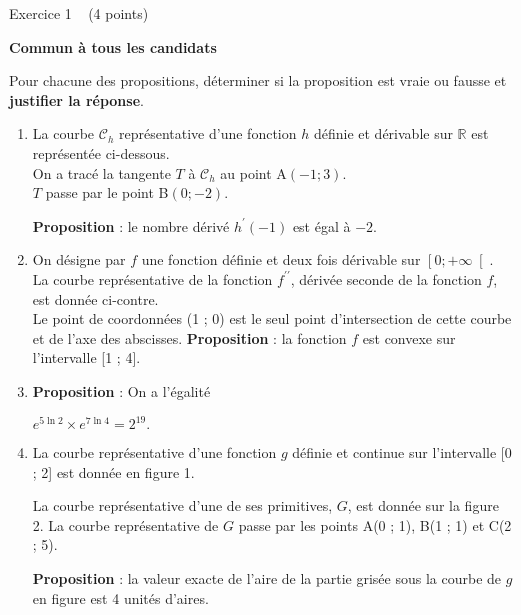 
%
\begin{h2}Exercice 1   (4 points)\end{h2}
\textbf{Commun à tous les candidats}
\par
Pour chacune des propositions, déterminer si la proposition est vraie ou fausse et \textbf{justifier la réponse}.
\begin{enumerate}
     \item
     La courbe $\mathscr C_{h}$ représentative d'une fonction $h$ définie et dérivable sur $\mathbb{R}$ est représentée  ci-dessous.
\\
     On a tracé la tangente $T$ à $\mathscr C_{h}$ au point A$\left(- 1 ; 3\right)$.
\\     
     $T$ passe par le point B$\left(0 ;-2\right)$.

\begin{center}
\end{center}
     \textbf{Proposition}  : le nombre dérivé $h^{\prime}\left(-1\right)$ est égal à $-2$.
     \item
     On désigne par $f$ une fonction définie et deux fois dérivable sur $\left[0 ;+\infty \right[$.
\\
     La courbe représentative de la fonction $f^{\prime\prime}$, dérivée seconde de la fonction $f$, est donnée ci-contre.
\\
     Le point de coordonnées (1 ; 0) est le seul point d'intersection de cette courbe et de l'axe des abscisses.
     \textbf{Proposition} : la fonction $f$ est convexe sur l'intervalle [1 ; 4]. 
\begin{center}
\end{center}
     \item
     \textbf{Proposition} : On a l'égalité
     \par
     $e^{5\ln 2} \times  e^{7\ln 4}=2^{19}.$
     \item
     La courbe représentative d'une fonction $g$ définie et continue sur l'intervalle [0 ; 2] est donnée en figure 1.

\begin{center}
\end{center}
     La courbe représentative d'une de ses primitives, $G$, est donnée sur la figure 2. La courbe représentative de $G$ passe par les points A(0 ; 1), B(1 ; 1) et C(2 ; 5).

\begin{center}
\end{center}
     \textbf{Proposition} : la valeur exacte de l'aire de la partie grisée sous la courbe de $g$ en figure est 4 unités d'aires.
\end{enumerate}
